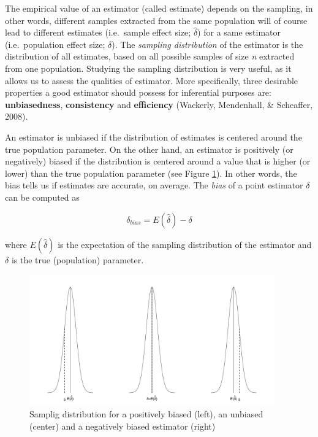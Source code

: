 \documentclass[
  man,floatsintext]{apa6}
\begin{document}
The empirical value of an estimator (called estimate) depends on the sampling, in other words, different samples extracted from the same population will of course lead to different estimates (i.e.~sample effect size; \(\hat{\delta}\)) for a same estimator (i.e.~population effect size; \(\delta\)). The \emph{sampling distribution} of the estimator is the distribution of all estimates, based on all possible samples of size \emph{n} extracted from one population. Studying the sampling distribution is very useful, as it allows us to assess the qualities of estimator. More specifically, three desirable properties a good estimator should possess for inferential purposes are: \textbf{unbiasedness}, \textbf{consistency} and \textbf{efficiency} (Wackerly, Mendenhall, \& Scheaffer, 2008).

An estimator is unbiased if the distribution of estimates is centered around the true population parameter. On the other hand, an estimator is positively (or negatively) biased if the distribution is centered around a value that is higher (or lower) than the true population parameter (see Figure \ref{fig:BIAS}). In other words, the bias tells us if estimates are accurate, on average. The \emph{bias} of a point estimator \(\delta\) can be computed as

\begin{equation} 
\delta_{bias}=E(\hat{\delta})-\delta
\label{eq:BIAS}
\end{equation}

where \(E(\hat{\delta})\) is the expectation of the sampling distribution of the estimator and \(\delta\) is the true (population) parameter.

\begin{figure}
\includegraphics[width=400px]{ES_files/figure-latex/BIAS-1} \caption{Samplig distribution for a positively biased (left), an unbiased (center) and a negatively biased estimator (right)}\label{fig:BIAS}
\end{figure}
\end{document}
